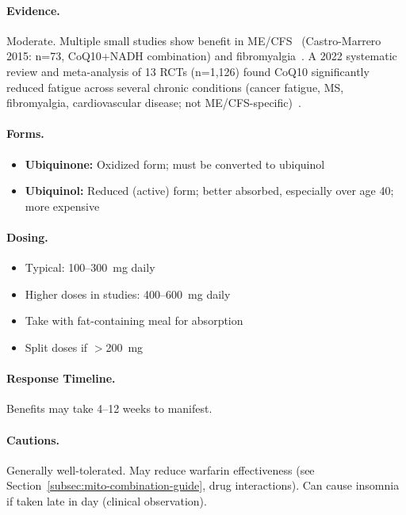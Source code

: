 \paragraph{Evidence.} Moderate. Multiple small studies show benefit in ME/CFS~\cite{Maes2009CoQ10,CastroMarrero2015} (Castro-Marrero 2015: n=73, CoQ10+NADH combination) and fibromyalgia~\cite{Cordero2013}. A 2022 systematic review and meta-analysis of 13 RCTs (n=1,126) found CoQ10 significantly reduced fatigue across several chronic conditions (cancer fatigue, MS, fibromyalgia, cardiovascular disease; not ME/CFS-specific)~\cite{Tsai2022CoQ10fatigue}.

\paragraph{Forms.}
\begin{itemize}
    \item \textbf{Ubiquinone:} Oxidized form; must be converted to ubiquinol
    \item \textbf{Ubiquinol:} Reduced (active) form; better absorbed, especially over age 40; more expensive
\end{itemize}

\paragraph{Dosing.}
\begin{itemize}
    \item Typical: 100--300~mg daily
    \item Higher doses in studies: 400--600~mg daily
    \item Take with fat-containing meal for absorption
    \item Split doses if $>$200~mg
\end{itemize}

\paragraph{Response Timeline.} Benefits may take 4--12 weeks to manifest.

\paragraph{Cautions.} Generally well-tolerated. May reduce warfarin effectiveness (see Section~\ref{subsec:mito-combination-guide}, drug interactions). Can cause insomnia if taken late in day (clinical observation).

